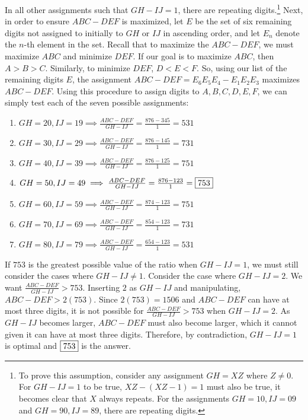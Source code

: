 \documentclass[10pt]{article}
\theoremstyle{plain}
\theoremstyle{definition}
\theoremstyle{remark}
\begin{document}
In all other assignments such that \(GH-IJ=1\), there are repeating digits.\footnote{To prove this assumption,  consider any assignment \(GH = XZ\) where \(Z \neq 0\). For \(GH-IJ=1\) to be true, \(XZ-(XZ-1)=1\) must also be true, it becomes clear that \(X\) always repeats. For the assignments \(GH=10, IJ=09\) and \(GH=90, IJ=89\), there are repeating digits.} Next, in order to ensure \(ABC-DEF\) is maximized, let \(E\) be the set of six remaining digits not assigned to initially to \(GH\) or \(IJ\) in ascending order, and let \(E_n\) denote the \(n\)-th element in the set. Recall that to maximize the \(ABC-DEF\), we must maximize \(ABC\) and minimize \(DEF\). If our goal is to maximize \(ABC\), then \(A>B>C\). Similarly, to minimize \(DEF\), \(D<E<F\). So, using our list of the remaining digits \(E\), the assignment \(ABC-DEF=E_6E_5E_4-E_1E_2E_3\) maximizes \(ABC-DEF\). Using this procedure to assign digits to \(A,B,C,D,E,F\), we can simply test each of the seven possible assignments:\

\begin{enumerate}
\item \(GH=20, IJ=19 \implies \frac{ABC-DEF}{GH-IJ}=\frac{876-345}{1}=531\) 
\item \(GH=30, IJ=29 \implies \frac{ABC-DEF}{GH-IJ}=\frac{876-145}{1}=731\) 
\item \(GH=40, IJ=39 \implies \frac{ABC-DEF}{GH-IJ}=\frac{876-125}{1}=751\) 
\item \(GH=50, IJ=49 \implies \frac{ABC-DEF}{GH-IJ}=\frac{876-123}{1}=\fbox{753}\) 
\item \(GH=60, IJ=59 \implies \frac{ABC-DEF}{GH-IJ}=\frac{874-123}{1}=751\) 
\item \(GH=70, IJ=69 \implies \frac{ABC-DEF}{GH-IJ}=\frac{854-123}{1}=731\) 
\item \(GH=80, IJ=79 \implies \frac{ABC-DEF}{GH-IJ}=\frac{654-123}{1}=531\)	
\end{enumerate}

If \(753\) is the greatest possible value of the ratio when \(GH-IJ=1\), we must still consider the cases where \(GH-IJ \neq 1\). Consider the case where \(GH-IJ=2\). We want \(\frac{ABC-DEF}{GH-IJ}>753\). Inserting \(2\) as \(GH-IJ\) and manipulating, \(ABC-DEF>2(753)\). Since \(2(753)=1506\) and \(ABC-DEF\) can have at most three digits, it is not possible for \(\frac{ABC-DEF}{GH-IJ}>753\) when \(GH-IJ=2\). As \(GH-IJ\) becomes larger, \(ABC-DEF\) must also become larger, which it cannot given it can have at most three digits. Therefore, by contradiction, \(GH-IJ=1\) is optimal and \(\fbox{753}\) is the answer. 
\end{document}
